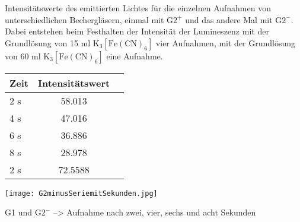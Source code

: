\begin{dsatable}
 \caption{Intensitätswerte des emittierten Lichtes für die einzelnen Aufnahmen von unterschiedlichen          Bechergläsern, einmal mit $\mathrm{G}2^+$ und das andere Mal mit $\mathrm{G}2^-$. Dabei entstehen beim Festhalten der Intensität der Lumineszenz mit der Grundlösung von 15 ml $\mathrm{K}_3[\mathrm{Fe}(\mathrm{CN})_6]$ vier Aufnahmen, mit der Grundlösung von 60 ml $\mathrm{K}_3[\mathrm{Fe}(\mathrm{CN})_6]$ eine Aufnahme.}
 \centering
 \begin{tabular}{lcr}
  \toprule
   Zeit            & Intensitätswert\\
  \midrule
   2 s			   & 58.013\\
   4 s		       & 47.016\\
   6 s		       & 36.886\\
   8 s		       & 28.978\\
  \midrule
   2 s		       & 72.5588\\
  \bottomrule
 \end{tabular}
 \label{dsatable:beispiel0}
\end{dsatable}

\begin{dsafigure}
 \centering
 \texttt{[image: G2minusSeriemitSekunden.jpg]}
 \caption{G1 und $\mathrm{G}2^-$ --> Aufnahme nach zwei, vier, sechs und acht Sekunden}
 \label{dsafigure:beispiel1}
\end{dsafigure} 
